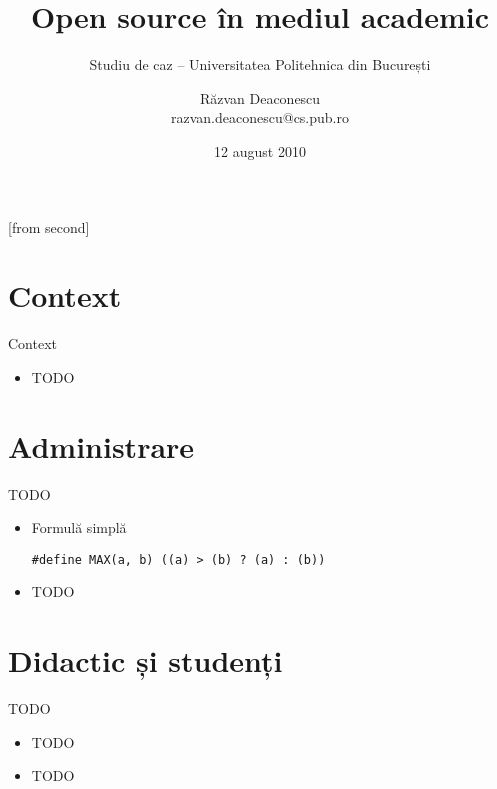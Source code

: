 \documentclass{beamer}
\title[Open source în mediul academic]{Open source în mediul academic}
\subtitle{Studiu de caz -- Universitatea Politehnica din București}
\institute{Întâlnirile lunare RLUG -- August 2010}
\author[Răzvan Deaconescu]{Răzvan Deaconescu\\
	razvan.deaconescu@cs.pub.ro}
\date{12 august 2010}
\begin{document}
[from second]


\frame{\titlepage}

\section{Context}

\begin{frame}{Context}
	\begin{itemize}		%
		\item TODO
	\end{itemize}
\end{frame}

\frame{\tableofcontents}

\section{Administrare}

\begin{frame}{TODO}
	\begin{itemize}
		\item Formulă simplă
			\begin{beamerboxesrounded}[lower=block body,shadow=true]{}
				\texttt{\#define MAX(a, b)   ((a) > (b) ? (a) : (b))}
			\end{beamerboxesrounded}
		\item TODO
	\end{itemize}
\end{frame}

\section{Didactic și studenți}

\begin{frame}{TODO}
	\begin{itemize}
		\item TODO
		\item TODO
	\end{itemize}
\end{frame}
\end{document}
